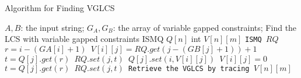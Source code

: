 \begin{algorithm*}[!thb]
  \caption{Algorithm for Finding VGLCS}
  \label{alg:serial-VGLCS}
  \begin{algorithmic}[1]
    \Require
      $A, B$: the input string;
      $G_A, G_B$: the array of variable gapped constraints;
    \Ensure Find the LCS with variable gapped constraints
    \State ISMQ $Q[n]$  
    \State int $V[n][m]$
      \State \tt{ISMQ} $RQ$
      \State $r = i - (GA[i]+1)$
            \State $V[i][j] = RQ.get(j - (GB[j]+1))+1$
            \State $t = Q[j].get(r)$ 
            \State $RQ.set(j, t)$ 
            \State $Q[j].set(i, V[i][j])$
        \Else
            \State $V[i][j] = 0$
            \State $t = Q[j].get(r)$
            \State $RQ.set(j, t)$
        \EndIf
      \EndFor
    \EndFor
    \State Retrieve the VGLCS by tracing $V[n][m]$
  \end{algorithmic}
\end{algorithm*}